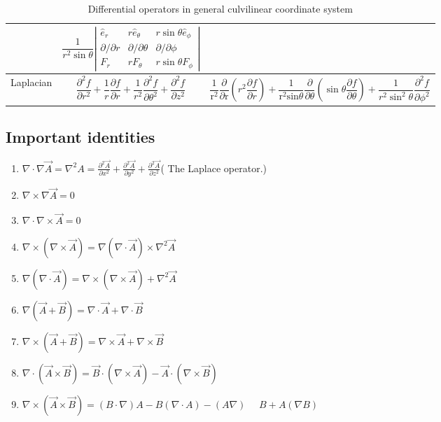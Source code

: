 \begin{table}[h]
\begin{tabular}{|p{1.8cm}|p{6cm}|p{8.5cm}|}
$$		$$ &$$
		\frac{1}{r^{2} \sin \theta}\left|\begin{array}{ccc}
			\hat{e}_{r} & r \hat{e}_{\theta} & r \sin \theta \hat{e}_{\phi} \\
			\partial / \partial r & \partial / \partial \theta & \partial / \partial \phi \\
			F_{r} & r F_{\theta} & r \sin \theta F_{\phi}
		\end{array}\right|
		$$ \\\hline
	Laplacian	& $$\frac{\partial^{2} f}{\partial r^{2}}+\frac{1}{r} \frac{\partial f}{\partial r}+\frac{1}{r^{2}} \frac{\partial^{2} f}{\partial \theta^{2}}+\frac{\partial^{2} f}{\partial z^{2}}$$ &$$
	\frac{1}{\mathrm{r}^{2}} \frac{\partial}{\partial \mathrm{r}}\left(r^{2} \frac{\partial f}{\partial r}\right)+\frac{1}{\mathrm{r^{2}sin} \theta} \frac{\partial}{\partial \theta}\left( \sin \theta \frac{\partial f}{\partial \theta}\right)+\frac{1}{r^{2} \sin^{2} \theta} \frac{\partial^{2} f}{\partial \phi^{2}}
	$$ 
	\\\hline

	\end{tabular}
\label{differential operators}
\caption{Differential operators in general culvilinear coordinate system}
\end{table}
\vspace{1cm}
	



\subsection{Important identities}
\begin{enumerate}
	 
	\item $\nabla \cdot \nabla \vec{A}=\nabla^{2} A=\frac{\partial^{2} \vec{A}}{\partial x^{2}}+\frac{\partial^{2} \vec{A}}{\partial y^{2}}+\frac{\partial^{2} \vec{A}}{\partial z^{2}}$( The Laplace operator.)
\item $\nabla \times \nabla \vec{A}=0$
\item $\nabla \cdot \nabla \times \vec{A}=0$
	\item $\nabla \times(\nabla \times \vec{A})=\nabla(\nabla \cdot \vec{A}) \times \nabla^{2} \vec{A}$
	\item $\nabla(\nabla \cdot \vec{A})=\nabla \times(\nabla \times \vec{A})+\nabla^{2} \vec{A}$
	\item $\nabla(\vec{A}+\vec{B})=\nabla \cdot \vec{A}+\nabla \cdot \vec{B}$
\item $\nabla \times(\vec{A}+\vec{B})=\nabla \times \vec{A}+\nabla \times \vec{B}$
\item $\nabla \cdot(\vec{A} \times \vec{B})=\vec{B} \cdot(\nabla \times \vec{A})-\vec{A} \cdot(\nabla \times \vec{B})$
\item $\nabla \times(\vec{A} \times \vec{B})=(B \cdot \nabla) A-B(\nabla \cdot A)-(A \nabla)$
$\quad B+A(\nabla B)$
\end{enumerate}
